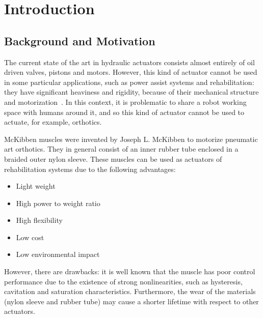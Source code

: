 
\chapter{Introduction}
\label{ch:introduction} %


\section{Background and Motivation}

The current state of the art in hydraulic actuators consists almost entirely of
oil driven valves, pistons and motors. However, this kind of actuator cannot be 
used in some particular applications, such as power assist systems and rehabilitation:
they have significant heaviness and rigidity, because of their mechanical structure and
motorization~\cite{mckibben_tondu}. 
In this context, it is problematic to share a robot working space with humans around it, 
and so this kind of actuator cannot be used to actuate, for example, orthotics.

McKibben muscles were invented by Joseph L. McKibben to motorize pneumatic art orthotics.
They in general consist of an inner rubber tube enclosed in a braided outer nylon sleeve.
These muscles can be used as actuators of rehabilitation systems due to the following advantages:

\begin{itemize}[noitemsep]
	\item Light weight
	\item High power to weight ratio
	\item High flexibility
	\item Low cost
	\item Low environmental impact
\end{itemize}

However, there are drawbacks: it is well known that the muscle has poor control performance
due to the existence of strong nonlinearities, such as hysteresis,
cavitation and saturation characteristics.
Furthermore, the wear of the materials (nylon sleeve and rubber tube)
may cause a shorter lifetime with respect to other actuators.


